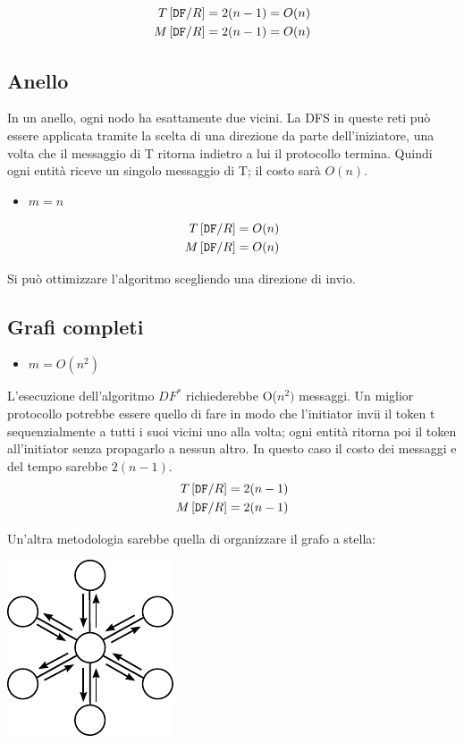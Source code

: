 \begin{equation*}
    \begin{split}
        T\left[\text{\texttt{DF}}/R\right] & = 2(n-1) = O(n)\\
        M\left[\text{\texttt{DF}}/R\right] & = 2(n-1) = O(n)
    \end{split}
\end{equation*}

\subsection{Anello}
In un anello, ogni nodo ha esattamente due vicini. La DFS in queste reti può
essere applicata tramite la scelta di una direzione da parte dell'iniziatore,
una volta che il messaggio di T ritorna indietro a lui il protocollo termina.
Quindi ogni entità riceve un singolo messaggio di T; il costo sarà $O(n)$.
\begin{itemize}
    \item $m = n$
\end{itemize}
\begin{equation*}
    \begin{split}
        T\left[\text{\texttt{DF}}/R\right] & = O(n) \\
        M\left[\text{\texttt{DF}}/R\right] & = O(n)
    \end{split}
\end{equation*}

Si può ottimizzare l'algoritmo scegliendo una direzione di invio.

\subsection{Grafi completi}
\begin{itemize}
    \item $m = O(n^2)$
\end{itemize}
L'esecuzione dell'algoritmo $DF^*$ richiederebbe O($n^2)$ messaggi. Un miglior
protocollo potrebbe essere quello di fare in modo che l'initiator invii il token
t sequenzialmente a tutti i suoi vicini uno alla volta; ogni entità ritorna poi
il token all'initiator senza propagarlo a nessun altro. In questo caso il costo
dei messaggi e del tempo sarebbe $2(n-1)$.
\begin{equation*}
    \begin{split}
        T\left[\text{\texttt{DF}}/R\right] & = 2(n-1)\\
        M\left[\text{\texttt{DF}}/R\right] & = 2(n-1)
    \end{split}
\end{equation*}

Un'altra metodologia sarebbe quella di organizzare il grafo a stella:
\begin{center}
    \includegraphics[scale=1]{capitoli/attraversamento/imgs/n_20}
\end{center}
